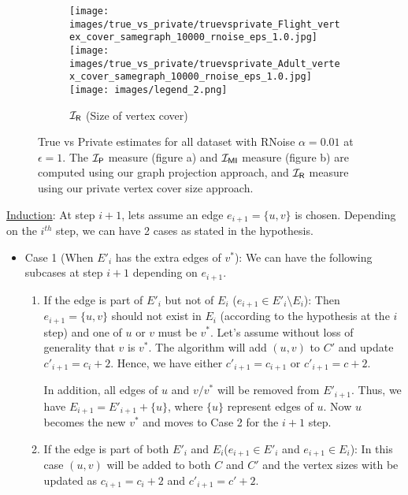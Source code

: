 {\begin{figure*}
\begin{subfigure}[b]{\textwidth}
         \hfill
         \texttt{[image: images/true\_vs\_private/truevsprivate\_Flight\_vertex\_cover\_samegraph\_10000\_rnoise\_eps\_1.0.jpg]}
         \hfill
         \texttt{[image: images/true\_vs\_private/truevsprivate\_Adult\_vertex\_cover\_samegraph\_10000\_rnoise\_eps\_1.0.jpg]}
         \texttt{[image: images/legend\_2.png]}
         \caption{$\mathcal{I_\mathsf{R}}$ (Size of vertex cover)}
         \label{fig:tp_rnoise_vcover}
     \end{subfigure}
     \caption{True vs Private estimates for all dataset with RNoise $\alpha = 0.01$ at $\epsilon=1$. The $\mathcal{I_\mathsf{P}}$ measure (figure a) and $\mathcal{I_{\mathsf{MI}}}$ measure (figure b) are computed using our graph projection approach, and $\mathcal{I_\mathsf{R}}$ measure using our private vertex cover size approach. }
     \label{fig:tp_RNoise}
\end{figure*}



\underline{Induction}: At step $i+1$, lets assume an edge $e_{i+1} = \{u, v\}$ is chosen. Depending on the $i^{th}$ step, we can have 2 cases as stated in the hypothesis.

\begin{itemize}
    \item Case 1 (When $E'_i$ has the extra edges of $v^*$): We can have the following subcases at step $i+1$ depending on $e_{i+1}$.
        \begin{enumerate}[label=\alph*),ref=\alph*]
            \item If the edge is part of $E'_{i}$ but not of $E_i$ ($e_{i+1} \in E'_{i} \setminus E_{i}$): Then $e_{i+1} = \{u, v\}$ should not exist in $E_i$ (according to the hypothesis at the $i$ step) and one of $u$ or $v$ must be $v^*$. Let's assume without loss of generality that $v$ is $v^*$. The algorithm will add $(u, v)$ to $C'$ and update $c'_{i+1} = c_i + 2$. Hence, we have either $c'_{i+1} = c_{i+1}$ or $c'_{i+1} = c + 2$.

            In addition, all edges of $u$ and $v/v^*$ will be removed from $E'_{i+1}$. Thus, we have $E_{i+1} = E'_{i+1} + \{u\}$, where $\{u\}$ represent edges of $u$. Now $u$ becomes the new $v^*$ and moves to Case 2 for the $i+1$ step.  
            
            \item If the edge is part of both $E'_i$ and $E_i$($e_{i+1} \in E'_i$ and $e_{i+1} \in E_i$): In this case $(u,v)$ will be added to both $C$ and $C'$ and the vertex sizes with be updated as $c_{i+1} = c_i + 2$ and $c'_{i+1} = c' + 2$. 


\end{enumerate}
\end{itemize}}
